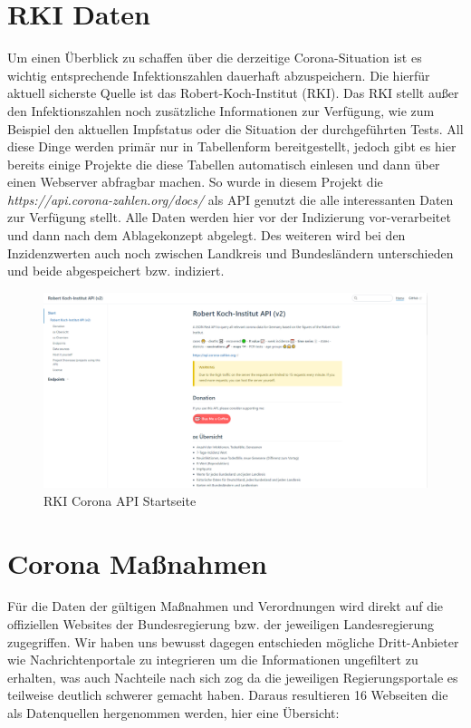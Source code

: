 \documentclass[12pt,oneside,a4paper,parskip]{scrbook}
\begin{document}
\section{RKI Daten}
Um einen \"Uberblick zu schaffen \"uber die derzeitige Corona-Situation ist es wichtig entsprechende Infektionszahlen dauerhaft abzuspeichern. Die hierf\"ur aktuell sicherste Quelle ist das Robert-Koch-Institut (RKI). Das RKI stellt außer den Infektionszahlen noch zus\"atzliche Informationen zur Verf\"ugung, wie zum Beispiel den aktuellen Impfstatus oder die Situation der durchgef\"uhrten Tests.\newline
All diese Dinge werden prim\"ar nur in Tabellenform bereitgestellt, jedoch gibt es hier bereits einige Projekte die diese Tabellen automatisch einlesen und dann \"uber einen Webserver abfragbar machen. So wurde in diesem Projekt die \textit{https://api.corona-zahlen.org/docs/} als API genutzt die alle interessanten Daten zur Verf\"ugung stellt. \newline
Alle Daten werden hier vor der Indizierung vor-verarbeitet und dann nach dem Ablagekonzept abgelegt.
Des weiteren wird bei den Inzidenzwerten auch noch zwischen Landkreis und Bundesl\"andern unterschieden und beide abgespeichert bzw. indiziert.
\begin{figure}[H]
	\centering
	\includegraphics[scale=0.4]{rkiapiOverview.png}
	\captionsetup{justification=centering}
	\caption{RKI Corona API Startseite}
	\label{pic:rkiapiOverview}
\end{figure}

\section{Corona Maßnahmen}
Für die Daten der gültigen Maßnahmen und Verordnungen wird direkt auf die offiziellen Websites der Bundesregierung bzw. der jeweiligen Landesregierung zugegriffen. Wir haben uns bewusst dagegen entschieden mögliche Dritt-Anbieter wie Nachrichtenportale zu integrieren um die Informationen ungefiltert zu erhalten, was auch Nachteile nach sich zog da die jeweiligen Regierungsportale es teilweise deutlich schwerer gemacht haben. Daraus resultieren 16 Webseiten die als Datenquellen hergenommen werden, hier eine Übersicht:
\end{document}
